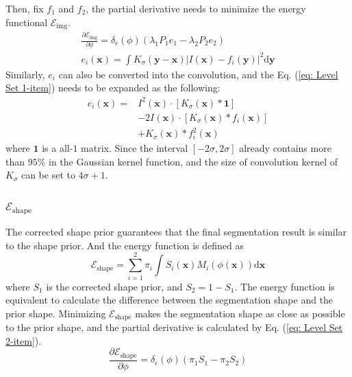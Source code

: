 Then, fix $f_1$ and $f_2$, the partial derivative needs to minimize the energy functional $\mathcal{E}_{\text{img}}$.
\begin{multline}\label{eq: Level Set 1-item}
    \frac{\partial \mathcal{E}_{\text{img}}}{\partial \phi} = \delta_\epsilon(\phi)\left(\lambda_1P_1e_1-  \lambda_2P_2e_2 \right) \\
    e_i(\mathbf{x}) = \int K_\sigma(\mathbf{y}-\mathbf{x})\left| I(\mathbf{x})-f_i(\mathbf{y}) \right|^2 \mathrm{d}\mathbf{y}
\end{multline}
Similarly, $e_i$ can also be converted into the convolution, and the Eq. (\ref{eq: Level Set 1-item}) needs to be expanded as the following:
\begin{equation}
    \begin{split}
        e_i(\mathbf{x}) =
        & I^2(\mathbf{x})\cdot\left[ K_\sigma(\mathbf{x})\ast \mathbf{1} \right] \\
        & - 2I(\mathbf{x})\cdot\left[ K_\sigma(\mathbf{x})\ast f_i(\mathbf{x}) \right] \\
        & + K_\sigma(\mathbf{x}) \ast f_i^2(\mathbf{x})
    \end{split}
\end{equation}
where $\mathbf{1}$ is a all-$1$ matrix. Since the interval $[-2\sigma, 2\sigma]$ already contains more than $95\%$ in the Gaussian kernel function, and the size of convolution kernel of $K_\sigma$ can be set to $4\sigma +1$.

\subsubsection{$\mathcal{E}_{\text{shape}}$}
The corrected shape prior guarantees that the final segmentation result is similar to the shape prior. And the energy function is defined as
\begin{equation}
    \mathcal{E}_{\text{shape}} = \sum_{i=1}^2 \pi_i \int S_i(\mathbf{x}) M_i(\phi(\mathbf{x})) \mathrm{d}\mathbf{x}
\end{equation}
where $S_1$ is the corrected shape prior, and $S_2 = 1- S_1$. The energy function is equivalent to calculate the difference between the segmentation shape and the prior shape. Minimizing $\mathcal{E}_{\text{shape}}$ makes the segmentation shape as close as possible to the prior shape, and the partial derivative is calculated by Eq. (\ref{eq: Level Set 2-item}).
\begin{equation}\label{eq: Level Set 2-item}
    \frac{\partial \mathcal{E}_{\text{shape}}}{\partial \phi} = \delta_\epsilon(\phi)(\pi_1 S_1 - \pi_2 S_2)
\end{equation}

